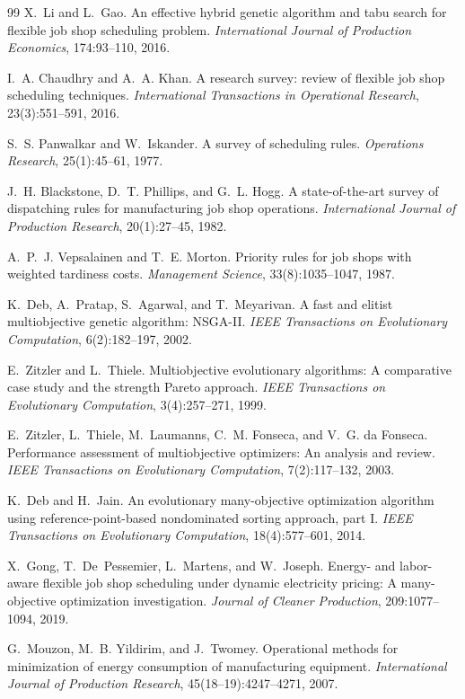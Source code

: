 \begin{thebibliography}{99}
X.~Li and L.~Gao.
An effective hybrid genetic algorithm and tabu search for flexible job shop scheduling problem.
\emph{International Journal of Production Economics}, 174:93--110, 2016.

I.~A. Chaudhry and A.~A. Khan.
A research survey: review of flexible job shop scheduling techniques.
\emph{International Transactions in Operational Research}, 23(3):551--591, 2016.

S.~S. Panwalkar and W.~Iskander.
A survey of scheduling rules.
\emph{Operations Research}, 25(1):45--61, 1977.

J.~H. Blackstone, D.~T. Phillips, and G.~L. Hogg.
A state-of-the-art survey of dispatching rules for manufacturing job shop operations.
\emph{International Journal of Production Research}, 20(1):27--45, 1982.

A.~P.~J. Vepsalainen and T.~E. Morton.
Priority rules for job shops with weighted tardiness costs.
\emph{Management Science}, 33(8):1035--1047, 1987.

K.~Deb, A.~Pratap, S.~Agarwal, and T.~Meyarivan.
A fast and elitist multiobjective genetic algorithm: NSGA-II.
\emph{IEEE Transactions on Evolutionary Computation}, 6(2):182--197, 2002.

E.~Zitzler and L.~Thiele.
Multiobjective evolutionary algorithms: A comparative case study and the strength {P}areto approach.
\emph{IEEE Transactions on Evolutionary Computation}, 3(4):257--271, 1999.

E.~Zitzler, L.~Thiele, M.~Laumanns, C.~M. Fonseca, and V.~G. da Fonseca.
Performance assessment of multiobjective optimizers: An analysis and review.
\emph{IEEE Transactions on Evolutionary Computation}, 7(2):117--132, 2003.

K.~Deb and H.~Jain.
An evolutionary many-objective optimization algorithm using reference-point-based nondominated sorting approach, part {I}.
\emph{IEEE Transactions on Evolutionary Computation}, 18(4):577--601, 2014.

X.~Gong, T.~De~Pessemier, L.~Martens, and W.~Joseph.
Energy- and labor-aware flexible job shop scheduling under dynamic electricity pricing: A many-objective optimization investigation.
\emph{Journal of Cleaner Production}, 209:1077--1094, 2019.

G.~Mouzon, M.~B. Yildirim, and J.~Twomey.
Operational methods for minimization of energy consumption of manufacturing equipment.
\emph{International Journal of Production Research}, 45(18--19):4247--4271, 2007.


\end{thebibliography}
